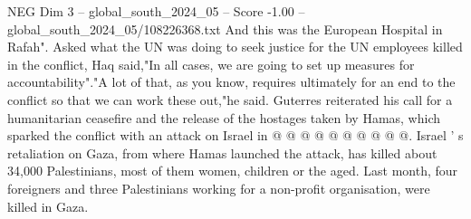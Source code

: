 \begin{textsample}{NEG Dim 3 – global\_south\_2024\_05 – Score -1.00 – global\_south\_2024\_05/108226368.txt}
And this was the European Hospital in Rafah".
Asked what the UN was doing to seek justice for the UN employees killed in the conflict, Haq said,"In all cases, we are going to set up measures for accountability"."A lot of that, as you know, requires ultimately for an end to the conflict so that we can work these out,"he said.
Guterres reiterated his call for a humanitarian ceasefire and the release of the hostages taken by Hamas, which sparked the conflict with an attack on Israel in @ @ @ @ @ @ @ @ @ @.
Israel ' s retaliation on Gaza, from where Hamas launched the attack, has killed about 34,000 Palestinians, most of them women, children or the aged.
Last month, four foreigners and three Palestinians working for a non-profit organisation, were killed in Gaza.

\end{textsample}
